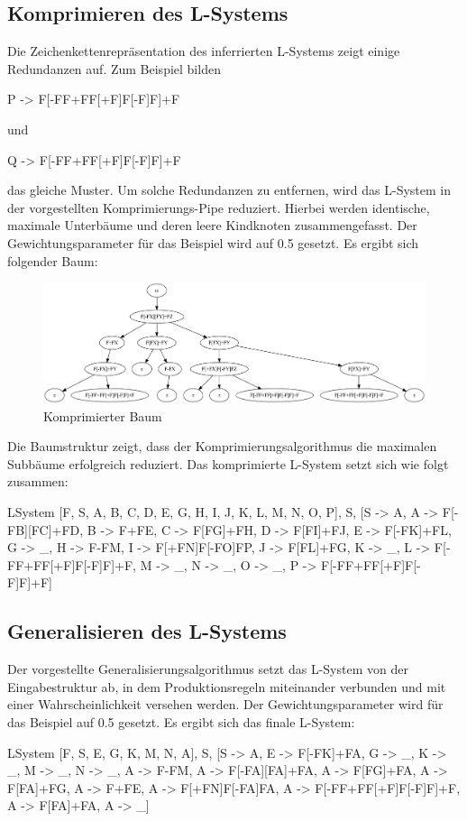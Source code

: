 \subsection*{Komprimieren des L-Systems}
Die Zeichenkettenrepräsentation des inferrierten L-Systems zeigt einige Redundanzen auf.
Zum Beispiel bilden
\begin{csource}
P -> F[-FF+FF[+F]F[-F]F]+F
\end{csource}
und
\begin{csource}
Q -> F[-FF+FF[+F]F[-F]F]+F
\end{csource}
das gleiche Muster.
Um solche Redundanzen zu entfernen, wird das L-System in der vorgestellten Komprimierungs-Pipe reduziert.
Hierbei werden identische, maximale Unterbäume und deren leere Kindknoten zusammengefasst.
Der Gewichtungsparameter für das Beispiel wird auf 0.5 gesetzt.
Es ergibt sich folgender Baum:
\begin{figure}[H]
    \centering
    \includegraphics[width=14cm]{../images/compressed_tree.png}
    \caption{Komprimierter Baum}
\end{figure}

Die Baumstruktur zeigt, dass der Komprimierungsalgorithmus die maximalen Subbäume erfolgreich reduziert.
Das komprimierte L-System setzt sich wie folgt zusammen:
\begin{csource}
LSystem{
    [F, S, A, B, C, D, E, G, H, I, J, K, L, M, N, O, P],
    S,
    [S -> A, A -> F[-FB][FC]+FD, B -> F+FE, C -> F[FG]+FH, D -> F[FI]+FJ, E -> F[-FK]+FL, G -> _, H -> F-FM, I -> F[+FN]F[-FO]FP, J -> F[FL]+FG, K -> _, L -> F[-FF+FF[+F]F[-F]F]+F, M -> _, N -> _, O -> _, P -> F[-FF+FF[+F]F[-F]F]+F]
}
\end{csource}

\subsection*{Generalisieren des L-Systems}
Der vorgestellte Generalisierungsalgorithmus setzt das L-System von der Eingabestruktur ab, in dem
Produktionsregeln miteinander verbunden und mit einer Wahrscheinlichkeit versehen werden.
Der Gewichtungsparameter wird für das Beispiel auf 0.5 gesetzt.
Es ergibt sich das finale L-System:
\begin{csource}
LSystem{
    [F, S, E, G, K, M, N, A],
    S,
    [S -> A, E -> F[-FK]+FA, G -> _, K -> _, M -> _, N -> _, A -> F-FM, A -> F[-FA][FA]+FA, A -> F[FG]+FA, A -> F[FA]+FG, A -> F+FE, A -> F[+FN]F[-FA]FA, A -> F[-FF+FF[+F]F[-F]F]+F, A -> F[FA]+FA, A -> _]
}
\end{csource}

